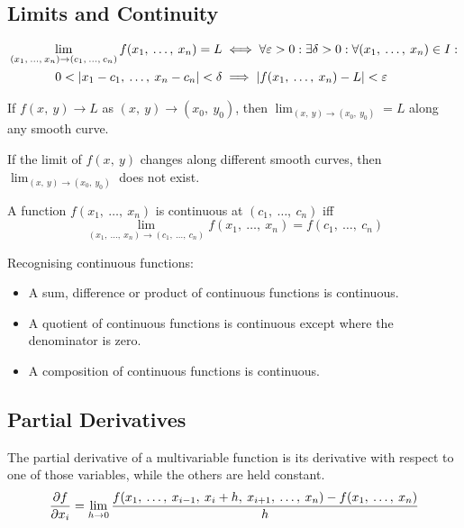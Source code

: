 \documentclass{article}
\begin{document}
\subsection{Limits and Continuity}
\begin{definition}
    \begin{align*}
		\lim_{(x_1,\: \ldots,\: x_n)\to (c_1,\: \ldots,\: c_n)} f(x_1,\: \ldots,\: x_n) = L
        &\iff\forall\varepsilon>0: \exists\delta>0: \forall (x_1,\: \ldots,\: x_n) \in I: \\
        0<\abs{x_1-c_1,\: \ldots,\: x_n-c_n}<\delta &\implies \abs{f(x_1,\: \ldots,\: x_n)-L}<\varepsilon
	\end{align*}
\end{definition}
\begin{theorem}
    If $f(x,\: y) \to L$ as $(x,\: y) \to (x_0,\: y_0)$, then
    $\displaystyle \lim_{(x,\: y) \to (x_0,\: y_0)} = L$ along any smooth
    curve.
\end{theorem}
\begin{theorem}
    If the limit of $f(x,\: y)$ changes along different smooth curves, then
    $\displaystyle \lim_{(x,\: y) \to (x_0,\: y_0)}$ does not exist.
\end{theorem}
\begin{theorem}
    A function $f(x_1,\: \ldots,\: x_n)$ is continuous at
    $(c_1,\: \ldots,\: c_n)$ iff
    \begin{equation*}
        \lim_{(x_1,\: \ldots,\: x_n)\to (c_1,\: \ldots,\: c_n)} f(x_1,\: \ldots,\: x_n) = f(c_1,\: \ldots,\: c_n)
    \end{equation*}
\end{theorem}
Recognising continuous functions:
\begin{itemize}
    \item A sum, difference or product of continuous functions is continuous.
    \item A quotient of continuous functions is continuous except where the
        denominator is zero.
    \item A composition of continuous functions is continuous.
\end{itemize}
\subsection{Partial Derivatives}
\begin{definition}
    The partial derivative of a multivariable function is its derivative with
    respect to one of those variables, while the others are held constant.
    \begin{equation*}
        \pdv{f}{x_i} = \lim_{h \to 0} \frac{f(x_1,\: \ldots,\: x_{i-1},\: x_i+h,\: x_{i+1},\: \ldots,\: x_n) - f(x_1,\: \ldots,\: x_n)}{h}
    \end{equation*}
\end{definition}
\end{document}
